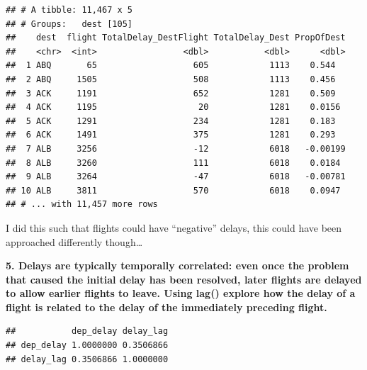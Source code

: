 \documentclass[]{book}
\newenvironment{Shaded}{\begin{snugshade}}{\end{snugshade}}
\newcommand{\DataTypeTok}[1]{\textcolor[rgb]{0.13,0.29,0.53}{#1}}
\newcommand{\DecValTok}[1]{\textcolor[rgb]{0.00,0.00,0.81}{#1}}
\newcommand{\KeywordTok}[1]{\textcolor[rgb]{0.13,0.29,0.53}{\textbf{#1}}}
\newcommand{\NormalTok}[1]{#1}
\newcommand{\OperatorTok}[1]{\textcolor[rgb]{0.81,0.36,0.00}{\textbf{#1}}}
\newcommand{\StringTok}[1]{\textcolor[rgb]{0.31,0.60,0.02}{#1}}
\theoremstyle{definition}
\theoremstyle{definition}
\theoremstyle{definition}
\theoremstyle{remark}
\begin{document}
\begin{verbatim}
## # A tibble: 11,467 x 5
## # Groups:   dest [105]
##    dest  flight TotalDelay_DestFlight TotalDelay_Dest PropOfDest
##    <chr>  <int>                 <dbl>           <dbl>      <dbl>
##  1 ABQ       65                   605            1113    0.544  
##  2 ABQ     1505                   508            1113    0.456  
##  3 ACK     1191                   652            1281    0.509  
##  4 ACK     1195                    20            1281    0.0156 
##  5 ACK     1291                   234            1281    0.183  
##  6 ACK     1491                   375            1281    0.293  
##  7 ALB     3256                   -12            6018   -0.00199
##  8 ALB     3260                   111            6018    0.0184 
##  9 ALB     3264                   -47            6018   -0.00781
## 10 ALB     3811                   570            6018    0.0947 
## # ... with 11,457 more rows
\end{verbatim}

I did this such that flights could have ``negative'' delays, this could
have been approached differently though\ldots{}

\textbf{5. Delays are typically temporally correlated: even once the
problem that caused the initial delay has been resolved, later flights
are delayed to allow earlier flights to leave. Using lag() explore how
the delay of a flight is related to the delay of the immediately
preceding flight.}

\begin{Shaded}
\end{Shaded}

\begin{verbatim}
##           dep_delay delay_lag
## dep_delay 1.0000000 0.3506866
## delay_lag 0.3506866 1.0000000
\end{verbatim}
\end{document}
